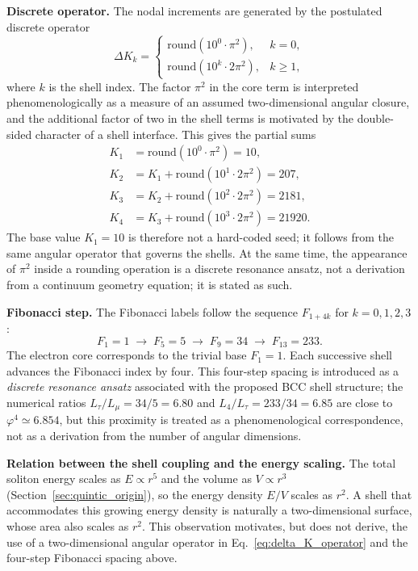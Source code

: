 \documentclass[10pt,a4paper]{article}
\begin{document}
\noindent
\textbf{Discrete operator.} The nodal increments are generated by the
postulated discrete operator
\begin{equation}
	\Delta K_k =
	\begin{cases}
		\mathrm{round}(10^0 \cdot \pi^2), & k = 0, \\[2pt]
		\mathrm{round}(10^k \cdot 2\pi^2), & k \geq 1,
	\end{cases}
	\label{eq:delta_K_operator}
\end{equation}
where $k$ is the shell index. The factor $\pi^2$ in the core term is
interpreted phenomenologically as a measure of an assumed
two-dimensional angular closure, and the additional factor of two in
the shell terms is motivated by the double-sided character of a shell
interface. This gives the partial sums
\begin{align}
	K_1 &= \mathrm{round}(10^0 \cdot \pi^2) = 10, \\
	K_2 &= K_1 + \mathrm{round}(10^1 \cdot 2\pi^2) = 207, \\
	K_3 &= K_2 + \mathrm{round}(10^2 \cdot 2\pi^2) = 2181, \\
	K_4 &= K_3 + \mathrm{round}(10^3 \cdot 2\pi^2) = 21920.
\end{align}
The base value $K_1 = 10$ is therefore not a hard-coded seed; it
follows from the same angular operator that governs the shells. At the
same time, the appearance of $\pi^2$ inside a rounding operation is a
discrete resonance ansatz, not a derivation from a continuum geometry
equation; it is stated as such.

\smallskip
\noindent
\textbf{Fibonacci step.} The Fibonacci labels follow the sequence
$F_{1+4k}$ for $k = 0, 1, 2, 3$:
\begin{equation}
	F_1 = 1 \;\longrightarrow\; F_5 = 5 \;\longrightarrow\; F_9 = 34
	\;\longrightarrow\; F_{13} = 233 .
\end{equation}
The electron core corresponds to the trivial base $F_1 = 1$. Each
successive shell advances the Fibonacci index by four. This four-step
spacing is introduced as a \emph{discrete resonance ansatz} associated
with the proposed BCC shell structure; the numerical ratios
$L_\tau/L_\mu = 34/5 = 6.80$ and $L_4/L_\tau = 233/34 = 6.85$ are close
to $\varphi^4 \simeq 6.854$, but this proximity is treated as a
phenomenological correspondence, not as a derivation from the number of
angular dimensions.

\smallskip
\noindent
\textbf{Relation between the shell coupling and the energy scaling.}
The total soliton energy scales as $E \propto r^5$ and the volume as
$V \propto r^3$ (Section~\ref{sec:quintic_origin}), so the energy
density $E/V$ scales as $r^2$. A shell that accommodates this growing
energy density is naturally a two-dimensional surface, whose area also
scales as $r^2$. This observation motivates, but does not derive, the
use of a two-dimensional angular operator in Eq.~\eqref{eq:delta_K_operator}
and the four-step Fibonacci spacing above.
\end{document}
